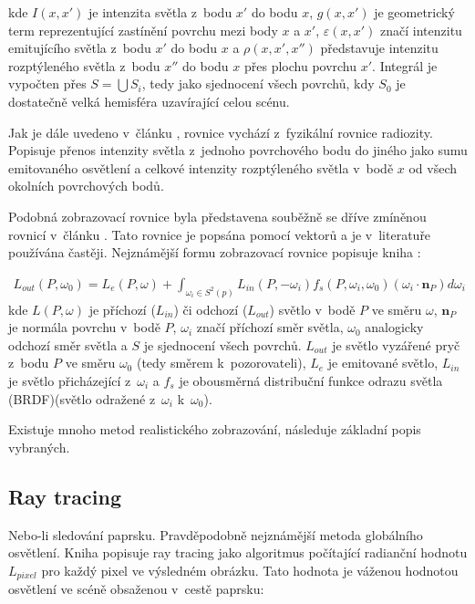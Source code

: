 kde $I(x, x')$ je intenzita světla z~bodu $x'$ do bodu $x$, $g(x, x')$ je geometrický term reprezentující zastínění povrchu mezi body $x$ a $x'$, $\varepsilon(x, x')$ značí intenzitu emitujícího světla z~bodu $x'$ do bodu $x$ a $\rho(x, x', x'')$ představuje intenzitu rozptýleného světla z~bodu $x''$ do bodu $x$ přes plochu povrchu $x'$. Integrál je vypočten přes $S = \bigcup S_i$, tedy jako sjednocení všech povrchů, kdy $S_0$ je dostatečně velká hemisféra uzavírající celou scénu.

Jak je dále uvedeno v~článku \cite{render_eq}, rovnice vychází z~fyzikální rovnice radiozity. Popisuje přenos intenzity světla z~jednoho povrchového bodu do jiného jako sumu emitovaného osvětlení a celkové intenzity rozptýleného světla v~bodě $x$ od všech okolních povrchových bodů.

Podobná zobrazovací rovnice byla představena souběžně se dříve zmíněnou rovnicí v~článku \cite{render_eq_2}. Tato rovnice je popsána pomocí vektorů a je v~literatuře používána častěji. Nejznámější formu zobrazovací rovnice popisuje kniha \cite{gfx_principles_practice}:

\begin{equation} \label{eq:render_2}
	\begin{gathered}
		L_{out}(P, \omega_0) = L_e(P, \omega) + \int_{\omega_i\in S^2(p)}L_{in}(P, -\omega_i)f_s(P, \omega_i, \omega_0)(\omega_i \cdot \textbf{n}_P)d\omega_i
	\end{gathered}
\end{equation}
kde $L(P, \omega)$ je příchozí ($L_{in}$) či odchozí ($L_{out}$) světlo v~bodě $P$ ve směru $\omega$, $\textbf{n}_P$ je normála povrchu v~bodě $P$, $\omega_i$ značí příchozí směr světla, $\omega_0$ analogicky odchozí směr světla a $S$ je sjednocení všech povrchů. $L_{out}$ je světlo vyzářené pryč z~bodu $P$ ve směru $\omega_0$ (tedy směrem k~pozorovateli), $L_e$ je emitované světlo, $L_{in}$ je světlo přicházející z~$\omega_i$ a $f_s$ je obousměrná distribuční funkce odrazu světla (BRDF)(světlo odražené z~$\omega_i$ k~$\omega_0$).

Existuje mnoho metod realistického zobrazování, následuje základní popis vybraných.

\subsection{Ray tracing}
Nebo-li sledování paprsku. Pravděpodobně nejznámější metoda globálního osvětlení. Kniha \cite{advanced_global} popisuje ray tracing jako algoritmus počítající radianční hodnotu $L_{pixel}$ pro každý pixel ve výsledném obrázku. Tato hodnota je váženou hodnotou osvětlení ve scéně obsaženou v~cestě paprsku:

